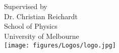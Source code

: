 \documentclass[12pt]{report}
\begin{document}
\thispagestyle{empty}
\begin{center}
\vspace{1cm}
\Huge{}\\
\vspace{2cm}
\Large{}\\
\vspace{2cm} %
\large{
Supervised by\\
Dr. Christian Reichardt}\\
\vspace{1cm}
\Large{School of Physics}\\
\large{University of Melbourne}\\
\vspace{.5cm}
\texttt{[image: figures/Logos/logo.jpg]}\\
\vspace{1cm}
\Large{}\\
\vspace{1.cm}
\normalsize
\\
\end{center}









\begin{abstract}
\\\\
\\\\
\end{abstract}

\tableofcontents

\newpage

\vspace*{\fill}
\section*{}


\section*{}
\vspace*{\fill}
\chapter{}

\section{}
\end{document}
